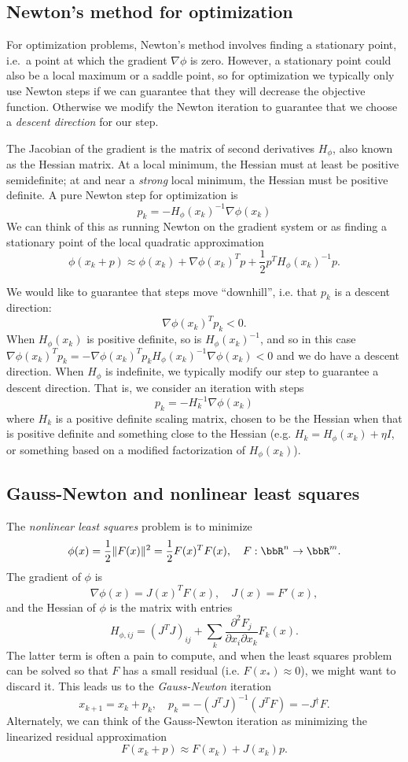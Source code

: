 \documentclass[12pt, leqno]{article}
\begin{document}
\subsection{Newton's method for optimization}

For optimization problems, Newton's method involves finding a
stationary point, i.e.~a point at which the gradient $\nabla \phi$ is
zero.  However, a stationary point could also be a local maximum or
a saddle point, so for optimization we typically only use Newton
steps if we can guarantee that they will decrease the objective
function.  Otherwise we modify the Newton iteration to guarantee
that we choose a {\em descent direction} for our step.

The Jacobian of the gradient is the matrix of second derivatives
$H_{\phi}$, also known as the Hessian matrix.  At a local minimum, the
Hessian must at least be positive semidefinite; at and near a {\em
  strong} local minimum, the Hessian must be positive definite.  A
pure Newton step for optimization is
\[
  p_k = -H_{\phi}(x_k)^{-1} \nabla \phi(x_k)
\]
We can think of this as running Newton on the gradient system
or as finding a stationary point of the local quadratic
approximation
\[
  \phi(x_k + p) \approx
  \phi(x_k) + \nabla \phi(x_k)^T p + \frac{1}{2} p^T  H_{\phi}(x_k)^{-1} p.
\]

We would like to guarantee that steps move ``downhill'', i.e.
that $p_k$ is a descent direction:
\[
  \nabla \phi(x_k)^T p_k < 0.
\]
When $H_{\phi}(x_k)$ is positive definite, so is $H_{\phi}(x_k)^{-1}$,
and so in this case $\nabla \phi(x_k)^T p_k = -\nabla \phi(x_k)^T p_k
H_{\phi}(x_k)^{-1} \nabla \phi(x_k) < 0$ and we do have a descent
direction.  When $H_{\phi}$ is indefinite, we typically modify our
step to guarantee a descent direction.  That is, we consider an
iteration with steps
\[
  p_k = -H_k^{-1} \nabla \phi(x_k)
\]
where $H_k$ is a positive definite scaling matrix, chosen to be the
Hessian when that is positive definite and something close to the
Hessian (e.g. $H_k = H_{\phi}(x_k) + \eta I$, or something based on
a modified factorization of $H_{\phi}(x_k)$).

\subsection{Gauss-Newton and nonlinear least squares}

The {\em nonlinear least squares} problem is to minimize
\[
  \phi(x) = \frac{1}{2} \|F(x)\|^2 = \frac{1}{2} F(x)^T F(x),
  \quad F : \bbR^{n} \rightarrow \bbR^{m}.
\]
The gradient of $\phi$ is
\[
  \nabla \phi(x) = J(x)^T F(x), \quad J(x) = F'(x),
\]
and the Hessian of $\phi$ is the matrix with entries
\[
H_{\phi,ij} = (J^T J)_{ij} +
\sum_k \frac{\partial^2 F_j}{\partial x_i \partial x_k} F_k(x).
\]
The latter term is often a pain to compute, and when the least squares
problem can be solved so that $F$ has a small residual (i.e. $F(x_*)
\approx 0$), we might want to discard it.  This leads us to the
{\em Gauss-Newton} iteration
\[
  x_{k+1} = x_k + p_k, \quad p_k = -(J^T J)^{-1} (J^T F) = -J^\dagger F.
\]
Alternately, we can think of the Gauss-Newton iteration as minimizing
the linearized residual approximation
\[
  F(x_k + p) \approx F(x_k) + J(x_k) p.
\]
\end{document}
